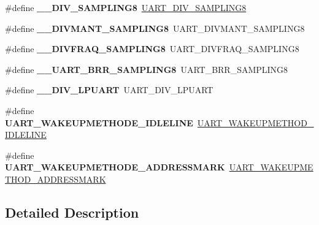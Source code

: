 \begin{DoxyCompactItemize}
\item 
\mbox{\label{group___h_a_l___u_a_r_t___aliased___defines_ga5cba2faadc25e5ece57cd3322adf4151}} 
\#define {\bfseries \+\_\+\+\_\+\+D\+I\+V\+\_\+\+S\+A\+M\+P\+L\+I\+N\+G8}~\mbox{\hyperlink{group___u_a_r_t___private___macros_ga3b4ab2ec164132268de4719de4625a82}{U\+A\+R\+T\+\_\+\+D\+I\+V\+\_\+\+S\+A\+M\+P\+L\+I\+N\+G8}}
\item 
\mbox{\label{group___h_a_l___u_a_r_t___aliased___defines_ga79e617709be4f56d9a327ca3a7dc316f}} 
\#define {\bfseries \+\_\+\+\_\+\+D\+I\+V\+M\+A\+N\+T\+\_\+\+S\+A\+M\+P\+L\+I\+N\+G8}~U\+A\+R\+T\+\_\+\+D\+I\+V\+M\+A\+N\+T\+\_\+\+S\+A\+M\+P\+L\+I\+N\+G8
\item 
\mbox{\label{group___h_a_l___u_a_r_t___aliased___defines_gac09eaea0db063364f5aac90f47791989}} 
\#define {\bfseries \+\_\+\+\_\+\+D\+I\+V\+F\+R\+A\+Q\+\_\+\+S\+A\+M\+P\+L\+I\+N\+G8}~U\+A\+R\+T\+\_\+\+D\+I\+V\+F\+R\+A\+Q\+\_\+\+S\+A\+M\+P\+L\+I\+N\+G8
\item 
\mbox{\label{group___h_a_l___u_a_r_t___aliased___defines_ga446f5df9b1c7c4f2bded186402dd4e62}} 
\#define {\bfseries \+\_\+\+\_\+\+U\+A\+R\+T\+\_\+\+B\+R\+R\+\_\+\+S\+A\+M\+P\+L\+I\+N\+G8}~U\+A\+R\+T\+\_\+\+B\+R\+R\+\_\+\+S\+A\+M\+P\+L\+I\+N\+G8
\item 
\mbox{\label{group___h_a_l___u_a_r_t___aliased___defines_gaa81cd3c42fac5a329fd499964658c20e}} 
\#define {\bfseries \+\_\+\+\_\+\+D\+I\+V\+\_\+\+L\+P\+U\+A\+RT}~U\+A\+R\+T\+\_\+\+D\+I\+V\+\_\+\+L\+P\+U\+A\+RT
\item 
\mbox{\label{group___h_a_l___u_a_r_t___aliased___defines_gab6e73a11dc29f715c2f3e48df9d9f30f}} 
\#define {\bfseries U\+A\+R\+T\+\_\+\+W\+A\+K\+E\+U\+P\+M\+E\+T\+H\+O\+D\+E\+\_\+\+I\+D\+L\+E\+L\+I\+NE}~\mbox{\hyperlink{group___u_a_r_t___wake_up___methods_ga2411ed44c5d82db84c5819e1e2b5b8b3}{U\+A\+R\+T\+\_\+\+W\+A\+K\+E\+U\+P\+M\+E\+T\+H\+O\+D\+\_\+\+I\+D\+L\+E\+L\+I\+NE}}
\item 
\mbox{\label{group___h_a_l___u_a_r_t___aliased___defines_ga0535d8a60a1563f7216a0f4b62a39c43}} 
\#define {\bfseries U\+A\+R\+T\+\_\+\+W\+A\+K\+E\+U\+P\+M\+E\+T\+H\+O\+D\+E\+\_\+\+A\+D\+D\+R\+E\+S\+S\+M\+A\+RK}~\mbox{\hyperlink{group___u_a_r_t___wake_up___methods_ga4c6935f26f8f2a9fe70fd6306a9882cb}{U\+A\+R\+T\+\_\+\+W\+A\+K\+E\+U\+P\+M\+E\+T\+H\+O\+D\+\_\+\+A\+D\+D\+R\+E\+S\+S\+M\+A\+RK}}
\end{DoxyCompactItemize}


\subsection{Detailed Description}
